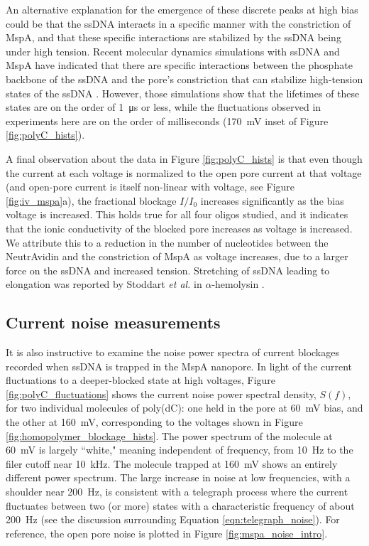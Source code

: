 An alternative explanation for the emergence of these discrete peaks at high bias could be that the ssDNA interacts in a specific manner with the constriction of MspA, and that these specific interactions are stabilized by the ssDNA being under high tension.  Recent molecular dynamics simulations with ssDNA and MspA have indicated that there are specific interactions between the phosphate backbone of the ssDNA and the pore's constriction that can stabilize high-tension states of the ssDNA \citep{Bhattacharya2016a}.  However, those simulations show that the lifetimes of these states are on the order of \SI{1}{\micro\s} or less, while the fluctuations observed in experiments here are on the order of milliseconds (\SI{170}{\mV} inset of Figure \ref{fig:polyC_hists}).

A final observation about the data in Figure \ref{fig:polyC_hists} is that even though the current at each voltage is normalized to the open pore current at that voltage (and open-pore current is itself non-linear with voltage, see Figure \ref{fig:iv_mspa}a), the fractional blockage $I/I_0$ increases significantly as the bias voltage is increased.  This holds true for all four oligos studied, and it indicates that the ionic conductivity of the blocked pore increases as voltage is increased.  We attribute this to a reduction in the number of nucleotides between the NeutrAvidin and the constriction of MspA as voltage increases, due to a larger force on the ssDNA and increased tension.  Stretching of ssDNA leading to elongation was reported by Stoddart \textit{et al.} in $\alpha$-hemolysin \citep{Stoddart2015}.

\subsection{Current noise measurements}

It is also instructive to examine the noise power spectra of current blockages recorded when ssDNA is trapped in the MspA nanopore.  In light of the current fluctuations to a deeper-blocked state at high voltages, Figure \ref{fig:polyC_fluctuations} shows the current noise power spectral density, $S(f)$, for two individual molecules of poly(dC): one held in the pore at \SI{60}{\mV} bias, and the other at \SI{160}{\mV}, corresponding to the voltages shown in Figure \ref{fig:homopolymer_blockage_hists}.  The power spectrum of the molecule at \SI{60}{\mV} is largely ``white," meaning independent of frequency, from \SI{10}{\Hz} to the filer cutoff near \SI{10}{\kHz}.  The molecule trapped at \SI{160}{\mV} shows an entirely different power spectrum.  The large increase in noise at low frequencies, with a shoulder near \SI{200}{\Hz}, is consistent with a telegraph process where the current fluctuates between two (or more) states \citep{Dutta1981} with a characteristic frequency of about \SI{200}{\Hz} (see the discussion surrounding Equation \ref{eqn:telegraph_noise}).  For reference, the open pore noise is plotted in Figure \ref{fig:mspa_noise_intro}.

